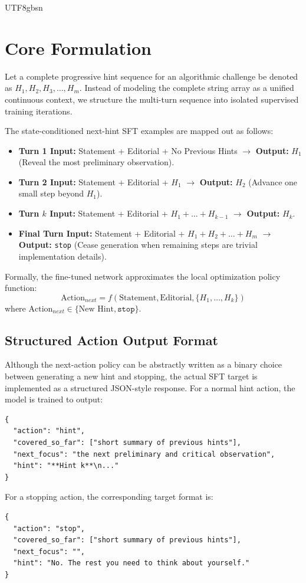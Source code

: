\documentclass{article}
\begin{document}
\begin{CJK*}{UTF8}{gbsn}
\section{Core Formulation}
Let a complete progressive hint sequence for an algorithmic challenge be denoted as $H_1, H_2, H_3, \dots, H_m$. Instead of modeling the complete string array as a unified continuous context, we structure the multi-turn sequence into isolated supervised training iterations.

The state-conditioned next-hint SFT examples are mapped out as follows:
\begin{itemize}
    \item \textbf{Turn 1 Input:} Statement + Editorial + No Previous Hints $\rightarrow$ \textbf{Output:} $H_1$ (Reveal the most preliminary observation).
    \item \textbf{Turn 2 Input:} Statement + Editorial + $H_1$ $\rightarrow$ \textbf{Output:} $H_2$ (Advance one small step beyond $H_1$).
    \item \textbf{Turn $k$ Input:} Statement + Editorial + $H_1 + \dots + H_{k-1}$ $\rightarrow$ \textbf{Output:} $H_k$.
    \item \textbf{Final Turn Input:} Statement + Editorial + $H_1 + H_2 + \dots + H_m$ $\rightarrow$ \textbf{Output:} \texttt{stop} (Cease generation when remaining steps are trivial implementation details).
\end{itemize}

Formally, the fine-tuned network approximates the local optimization policy function:
\begin{equation}
\text{Action}_{next} = f(\text{Statement}, \text{Editorial}, \{H_1, \dots, H_k\})
\end{equation}
where $\text{Action}_{next} \in \{\text{New Hint}, \texttt{stop}\}$.

\subsection{Structured Action Output Format}
Although the next-action policy can be abstractly written as a binary choice between generating a new hint and stopping, the actual SFT target is implemented as a structured JSON-style response. For a normal hint action, the model is trained to output:
\begin{verbatim}
{
  "action": "hint",
  "covered_so_far": ["short summary of previous hints"],
  "next_focus": "the next preliminary and critical observation",
  "hint": "**Hint k**\n..."
}
\end{verbatim}
For a stopping action, the corresponding target format is:
\begin{verbatim}
{
  "action": "stop",
  "covered_so_far": ["short summary of previous hints"],
  "next_focus": "",
  "hint": "No. The rest you need to think about yourself."
}
\end{verbatim}


\end{CJK*}
\end{document}
